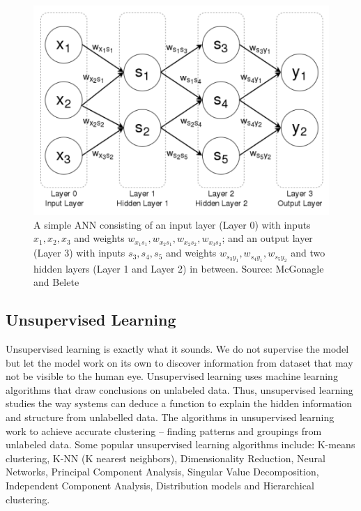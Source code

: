 \documentclass[master]{thesis-uestc}
\begin{document}
\begin{figure}[ht]
\includegraphics[width=5in]{pic/ANN.png}
\caption{A simple ANN consisting of an input layer (Layer 0) with inputs $x_1, x_2, x_3$ and weights $w_{x_1s_1}, w_{x_2s_1}, w_{x_2s_2}, w_{x_3s_2}$; and an output layer (Layer 3) with inputs $s_3, s_4, s_5$ and weights $w_{s_3y_1}, w_{s_4y_1}, w_{s_5y_2}$ and two hidden layers (Layer 1 and Layer 2) in between. Source: McGonagle and Belete}
\label{fig_ANN}
\end{figure}

\subsection{Unsupervised Learning}
Unsupervised learning is exactly what it sounds. We do not supervise the model but let the model work on its own to discover information from dataset that may not be visible to the human eye. Unsupervised learning uses machine learning algorithms that draw conclusions on unlabeled data. Thus, unsupervised learning studies the way systems can deduce a function to explain the hidden information and structure from unlabelled data. The algorithms in unsupervised learning work to achieve accurate clustering – finding patterns and groupings from unlabeled data. Some popular unsupervised learning algorithms include: K-means clustering, K-NN (K nearest neighbors), Dimensionality Reduction, Neural Networks, Principal Component Analysis, Singular Value Decomposition, Independent Component Analysis, Distribution models and Hierarchical clustering.
\end{document}
